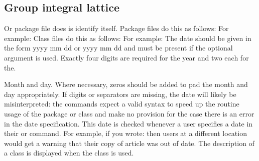 \documentclass{article}
\begin{document}
\subsection{Group integral lattice}
Or package file does is identify itself. Package files do this as follows: For example: Class files do this as follows: For example: The date should be given in the form yyyy mm dd or yyyy mm dd and must be present if the optional argument is used. Exactly four digits are required for the year and two each for the.

Month and day. Where necessary, zeros should be added to pad the month and day appropriately. If digits or separators are missing, the date will likely be misinterpreted: the commands expect a valid syntax to speed up the routine usage of the package or class and make no provision for the case there is an error in the date specification. This date is checked whenever a user specifies a date in their or command. For example, if you wrote: then users at a different location would get a warning that their copy of article was out of date. The description of a class is displayed when the class is used.
\end{document}
